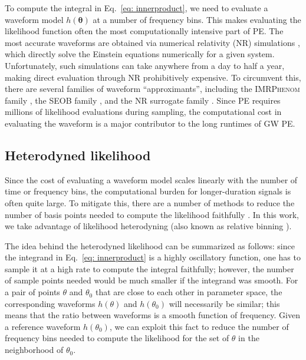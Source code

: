 \documentclass[twocolumn]{aastex631}
\begin{document}
To compute the integral in Eq.~\eqref{eq: innerproduct}, we need to evaluate a
waveform model $h(\mathbf{\theta})$ at a number of frequency bins. This makes
evaluating the likelihood function often the most computationally intensive
part of PE. The most accurate waveforms are obtained via numerical relativity
(NR) simulations \citep{BaumgarteShaprio:NumRel}, which directly solve the Einstein equations numerically for a
given system. Unfortunately, such simulations can take anywhere from a day to
half a year, making direct evaluation through NR prohibitively expensive. To
circumvent this, there are several families of waveform ``approximants'',
including the \textsc{IMRPhenom} family \citep{Khan:2015jqa,
Garcia-Quiros:2020qpx}, the \textsc{SEOB} family \citep{PhysRevD.89.061502}, and
the NR surrogate family \citep{Varma:2019csw}. Since PE requires millions of
likelihood evaluations during sampling, the computational cost in evaluating
the waveform is a major contributor to the long runtimes of GW PE.

\subsection{Heterodyned likelihood}

Since the cost of evaluating a waveform model scales linearly with the number
of time or frequency bins, the computational burden for longer-duration signals
is often quite large. To mitigate this, there are a number of methods to reduce
the number of basis points needed to compute the likelihood faithfully
\citep{Field:2011mf, Field:2013cfa, Smith:2016qas,
Vinciguerra:2017ngf,Morisaki:2020oqk,Morisaki:2021ngj}. In this work, we take
advantage of likelihood heterodyning \citep{Cornish:2010kf,Cornish:2021lje}
(also known as relative binning \citep{Zackay:2018qdy}).

The idea behind the heterodyned likelihood can be summarized as follows: since
the integrand in Eq.~\eqref{eq: innerproduct} is a highly oscillatory function,
one has to sample it at a high rate to compute the integral faithfully;
however, the number of sample points needed would be much smaller if the
integrand was smooth. For a pair of points $\theta$ and $\theta_0$ that are
close to each other in parameter space, the corresponding waveforms $h(\theta)$
and $h(\theta_0)$ will necessarily be similar; this means that the ratio
between waveforms is a smooth function of frequency. Given a reference
waveform $h(\theta_0)$, we can exploit this fact to reduce the number of
frequency bins needed to compute the likelihood for the set of $\theta$ in the
neighborhood of $\theta_0$.
\end{document}
